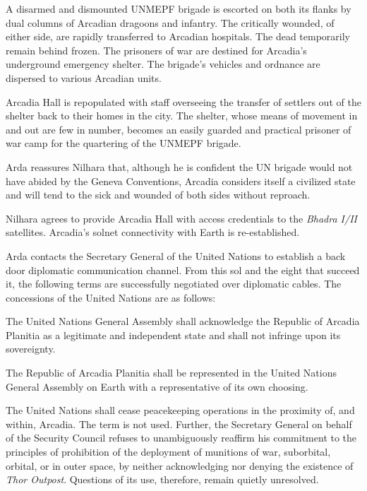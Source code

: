 

A disarmed and dismounted UNMEPF brigade is escorted on both its flanks by dual columns of Arcadian dragoons and infantry. The critically wounded, of either side, are rapidly transferred to Arcadian hospitals. The dead temporarily remain behind frozen. The prisoners of war are destined for Arcadia's underground emergency shelter. The brigade's vehicles and ordnance are dispersed to various Arcadian units.

Arcadia Hall is repopulated with staff overseeing the transfer of settlers out of the shelter back to their homes in the city. The shelter, whose means of movement in and out are few in number, becomes an easily guarded and practical prisoner of war camp for the quartering of the UNMEPF brigade.

Arda reassures Nilhara that, although he is confident the UN brigade would not have abided by the Geneva Conventions, Arcadia considers itself a civilized state and will tend to the sick and wounded of both sides without reproach.
\StopTimelineDate

Nilhara agrees to provide Arcadia Hall with access credentials to the {\it Bhadra I/II} satellites. Arcadia's solnet connectivity with Earth is re-established.

Arda contacts the Secretary General of the United Nations to establish a back door diplomatic communication channel. From this sol and the eight that succeed it, the following terms are successfully negotiated over diplomatic cables. The concessions of the United Nations are as follows:
\startitemize[n]
\item The United Nations General Assembly shall acknowledge the Republic of Arcadia Planitia as a legitimate and independent state and shall not infringe upon its sovereignty.
\item The Republic of Arcadia Planitia shall be represented in the United Nations General Assembly on Earth with a representative of its own choosing.
\item The United Nations shall cease peacekeeping operations in the proximity of, and within, Arcadia. The term  is not used. Further, the Secretary General on behalf of the Security Council refuses to unambiguously reaffirm his commitment to the principles of prohibition of the deployment of munitions of war, suborbital, orbital, or in outer space, by neither acknowledging nor denying the existence of {\it Thor Outpost}. Questions of its use, therefore, remain quietly unresolved.
\stopitemize

